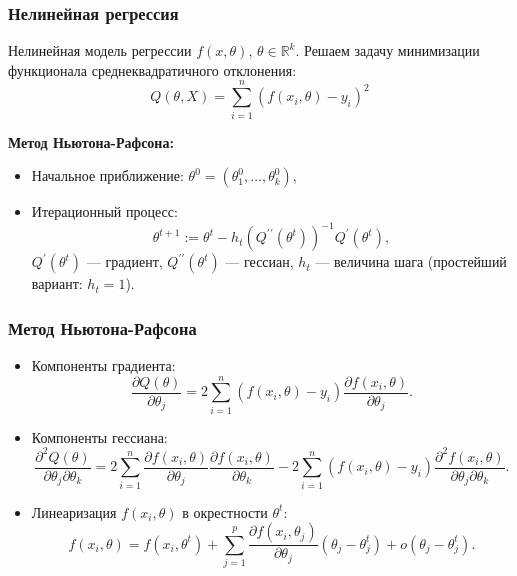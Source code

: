 \documentclass[10pt,unicode, notheorems]{beamer}
\begin{document}
\begin{frame}
\frametitle{Нелинейная регрессия}

 Нелинейная модель регрессии $f(x,\theta)$, $\theta\in\mathbb{R}^{k}$.
 Решаем задачу минимизации функционала среднеквадратичного отклонения:
\begin{equation*}
Q(\theta,X)
=
\sum_{i=1}^{n}\left(
f(x_{i},\theta)-y_{i}
\right)^{2}
\end{equation*}

\textbf{
Метод Ньютона-Рафсона:}
\begin{itemize}
\item Начальное приближение: $\theta^{0}=(\theta_{1}^{0},\ldots,\theta_{k}^{0})$,
\item Итерационный процесс: 
\begin{equation*}
\theta^{t+1}:=
\theta^{t}
-
h_{t}(Q^{\prime\prime}(\theta^{t}))^{-1}Q^{\prime}(\theta^{t}),
\end{equation*}
$Q^{\prime}(\theta^{t})$ --- градиент, $Q^{\prime\prime}(\theta^{t})$ --- гессиан, $h_{t}$ --- величина шага (простейший вариант: $h_{t}=1$).
\end{itemize}

\end{frame}

\begin{frame}
\frametitle{Метод Ньютона-Рафсона}
\begin{itemize}
\item Компоненты градиента:
\begin{equation*}
\frac{\partial Q(\theta)}{\partial \theta_{j}}
=
2\sum_{i=1}^{n}(f(x_{i},\theta)-y_{i})\frac{\partial f(x_{i},\theta)}{\partial \theta_j}.
\end{equation*}
\item Компоненты гессиана:
\begin{equation*}
\frac{\partial^{2} Q(\theta)}{\partial \theta_{j}\partial\theta_{k}}
=
2\sum_{i=1}^{n}
\frac{\partial f(x_{i},\theta)}{\partial\theta_{j}}
\frac{\partial f(x_{i},\theta)}{\partial\theta_{k}}
-
2\sum_{i=1}^{n}
(f(x_{i},\theta)-y_{i})
\frac{\partial^{2}f(x_{i},\theta)}{\partial\theta_{j}\partial\theta_{k}}.
\end{equation*}
\item Линеаризация $f(x_{i},\theta)$ в окрестности $\theta^{t}$:
\begin{equation*}
f(x_{i},\theta)
=
f(x_{i},\theta^{t})
+
\sum_{j=1}^{p}
\frac{\partial f(x_{i},\theta_{j})}{\partial\theta_{j}}
(\theta_{j}-\theta_{j}^{t})
+
o(\theta_{j}-\theta_{j}^{t}).
\end{equation*}
\end{itemize}
\end{frame}
\end{document}
